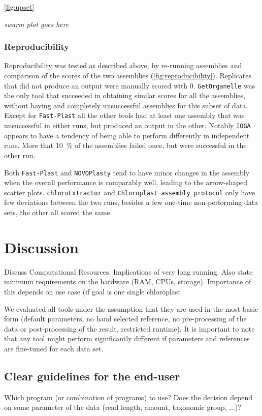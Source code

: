 \documentclass{bmcart}
\newcommand{\formatprogramnames}[1]{\texttt{#1}}
\newcommand{\ce}{\formatprogramnames{chloroExtractor}}
\newcommand{\fp}{\formatprogramnames{Fast-Plast}}
\newcommand{\ioga}{\formatprogramnames{IOGA}}
\newcommand{\np}{\formatprogramnames{NOVOPlasty}}
\newcommand{\go}{\formatprogramnames{GetOrganelle}}
\newcommand{\cassp}{\formatprogramnames{Chloroplast assembly protocol}}
\begin{document}

\cref{fig:upset}

\textit{swarm plot goes here}


\subsubsection*{Reproducibility}
Reproducibility was tested as described above, by re-running assemblies and comparison of the scores of the two assemblies (\cref{fig:reproducibility}).
Replicates that did not produce an output were manually scored with \num{0}. 
\go{} was the only tool that succeeded in obtaining similar scores for all the assemblies, without having and completely unsuccessful assemblies for this subset of data. Except for \fp{} all the other tools had at least one assembly that was unsuccessful in either runs, but produced an output in the other.  Notably \ioga{} appears to have a tendency of being able to perform differently in independent runs. More that \SI{10}{\percent} of the assemblies failed once, but were successful in the other run.

Both \fp{} and \np{} tend to have minor changes in the assembly when the overall performance is comparably well, leading to the arrow-shaped scatter plots. \ce{} and \cassp{} only have few deviations between the two runs, besides a few one-time non-performing data sets, the other all scored the same.

\section*{Discussion}
Discuss Computational Resources. Implications of very long running. Also state minimum requirements on the hardware (RAM, CPUs, storage). Importance of this depends on use case (if goal is one single chloroplast 

We evaluated all tools under the assumption that they are used in the most basic form (default parameters, no hand selected reference, no pre-processing of the data or post-processing of the result, restricted runtime). It is important to note that any tool might perform significantly different if parameters and references are fine-tuned for each data set.

\subsection*{Clear guidelines for the end-user}
Which program (or combination of programs) to use? Does the decision depend on some parameter of the data (read length, amount, taxonomic group, ...)?
\end{document}
